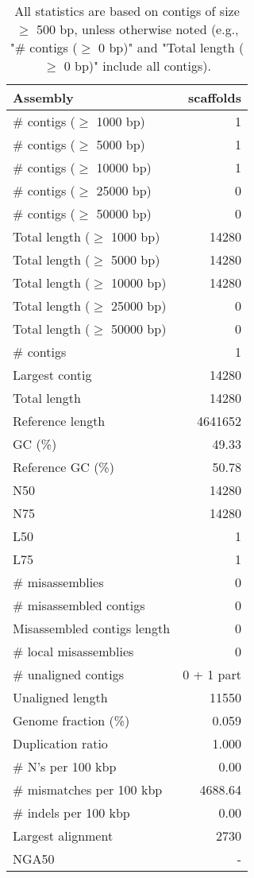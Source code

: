 \documentclass[12pt,a4paper]{article}
\begin{document}
\begin{table}[ht]
\begin{center}
\caption{All statistics are based on contigs of size $\geq$ 500 bp, unless otherwise noted (e.g., "\# contigs ($\geq$ 0 bp)" and "Total length ($\geq$ 0 bp)" include all contigs).}
\begin{tabular}{|l*{1}{|r}|}
\hline
Assembly & scaffolds \\ \hline
\# contigs ($\geq$ 1000 bp) & 1 \\ \hline
\# contigs ($\geq$ 5000 bp) & 1 \\ \hline
\# contigs ($\geq$ 10000 bp) & 1 \\ \hline
\# contigs ($\geq$ 25000 bp) & 0 \\ \hline
\# contigs ($\geq$ 50000 bp) & 0 \\ \hline
Total length ($\geq$ 1000 bp) & 14280 \\ \hline
Total length ($\geq$ 5000 bp) & 14280 \\ \hline
Total length ($\geq$ 10000 bp) & 14280 \\ \hline
Total length ($\geq$ 25000 bp) & 0 \\ \hline
Total length ($\geq$ 50000 bp) & 0 \\ \hline
\# contigs & 1 \\ \hline
Largest contig & 14280 \\ \hline
Total length & 14280 \\ \hline
Reference length & 4641652 \\ \hline
GC (\%) & 49.33 \\ \hline
Reference GC (\%) & 50.78 \\ \hline
N50 & 14280 \\ \hline
N75 & 14280 \\ \hline
L50 & 1 \\ \hline
L75 & 1 \\ \hline
\# misassemblies & 0 \\ \hline
\# misassembled contigs & 0 \\ \hline
Misassembled contigs length & 0 \\ \hline
\# local misassemblies & 0 \\ \hline
\# unaligned contigs & 0 + 1 part \\ \hline
Unaligned length & 11550 \\ \hline
Genome fraction (\%) & 0.059 \\ \hline
Duplication ratio & 1.000 \\ \hline
\# N's per 100 kbp & 0.00 \\ \hline
\# mismatches per 100 kbp & 4688.64 \\ \hline
\# indels per 100 kbp & 0.00 \\ \hline
Largest alignment & 2730 \\ \hline
NGA50 & - \\ \hline
\end{tabular}
\end{center}
\end{table}
\end{document}
